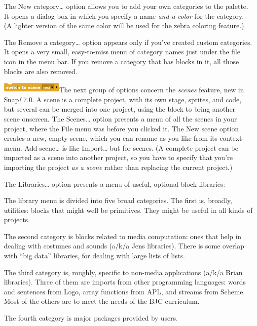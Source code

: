 The New category\ldots{} option allows you to add your own categories to
the palette. It opens a dialog box in which you specify a name \emph{and
a color} for the category. (A lighter version of the same color will be
used for the zebra coloring feature.)

The Remove a category\ldots{} option appears only if you've created
custom categories. It opens a very small, easy-to-miss menu of category
names just under the file icon in the menu bar. If you remove a category
that has blocks in it, all those blocks are also removed.

\includegraphics[width=1.16667in,height=0.19792in]{media/image999.png}The
next group of options concern the \emph{scenes} feature, new in
Snap\emph{!} 7.0. A scene is a complete project, with its own stage,
sprites, and code, but several can be merged into one project, using the
block to bring another scene onscreen. The Scenes\ldots{} option
presents a menu of all the scenes in your project, where the File menu
was before you clicked it. The New scene option creates a new, empty
scene, which you can rename as you like from its context menu. Add
scene\ldots{} is like Import\ldots{} but for scenes. (A complete project
can be imported as a scene into another project, so you have to specify
that you're importing the project \emph{as a scene} rather than
replacing the current project.)

The Libraries\ldots{} option presents a menu of useful, optional block
libraries:

The library menu is divided into five broad categories. The first is,
broadly, utilities: blocks that might well be primitives. They might be
useful in all kinds of projects.

The second category is blocks related to media computation: ones that
help in dealing with costumes and sounds (a/k/a Jens libraries). There
is some overlap with ``big data'' libraries, for dealing with large
lists of lists.

The third category is, roughly, specific to non-media applications
(a/k/a Brian libraries). Three of them are imports from other
programming languages: words and sentences from Logo, array functions
from APL, and streams from Scheme. Most of the others are to meet the
needs of the BJC curriculum.

The fourth category is major packages provided by users.

